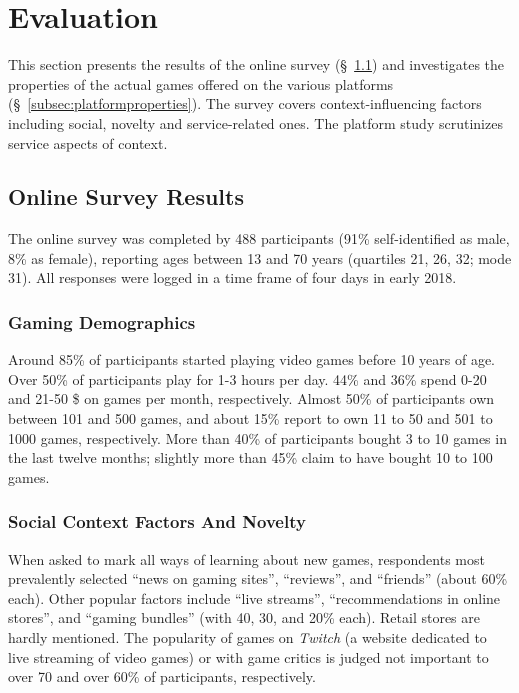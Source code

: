 \section{Evaluation}
\label{sec:eval}

This section presents the results of the online survey
(§~\ref{subsec:survey}) and
investigates the properties of the actual games offered on the
various platforms (§~\ref{subsec:platformproperties}).
The survey covers context-influencing factors including social,
novelty and service-related ones. The platform study scrutinizes
service aspects of context.

\subsection{Online Survey Results}\label{subsec:survey}
The online survey was completed by 488 participants
(91\% self-identified as male, 8\% as female), reporting
ages between 13 and 70 years (quartiles 21, 26, 32; mode 31).
All responses were logged in a time frame of four days in early 2018.

\subsubsection{Gaming Demographics}
Around 85\% of
participants started playing video games before 10 years of age.
Over 50\% of participants play for 1-3 hours per day.
44\% and 36\% spend 0-20 and 21-50 \$ on games per month, respectively.
Almost 50\% of participants own between 101 and 500 games, and about
15\% report to own 11 to 50 and 501 to 1000 games, respectively.
More than 40\% of participants bought 3 to 10 games in the last
twelve months; slightly more than 45\% claim to have bought
10 to 100 games.



\subsubsection{Social Context Factors And Novelty}

When asked to mark all ways of learning about new games, respondents
most prevalently selected ``news on gaming sites'', ``reviews'', and
``friends'' (about 60\% each). Other popular factors include
``live streams'', ``recommendations in online stores'', and
``gaming bundles'' (with 40, 30, and 20\% each). Retail stores
are hardly mentioned.
The popularity of games on \textit{Twitch} (a website dedicated to
live streaming of video games) or with game critics is judged not
important to over 70 and over 60\% of participants, respectively.


